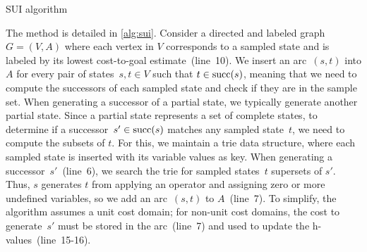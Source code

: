 \begin{algorithm}[tb]
    \caption{SUI algorithm}
    \label{alg:sui}

    \SetAlgoLined


\end{algorithm}

The method is detailed in \cref{alg:sui}. Consider a directed and labeled graph~$G=(V,A)$ where each vertex in $V$ corresponds to a sampled state and is labeled by its lowest cost-to-goal estimate~(line~10). We insert an arc~$(s,t)$ into $A$ for every pair of states~$s,t \in V$ such that $t \in \operatorname{succ}(s)$, meaning that we need to compute the successors of each sampled state and check if they are in the sample set. When generating a successor of a partial state, we typically generate another partial state. Since a partial state represents a set of complete states, to determine if a successor~$s' \in \operatorname{succ}(s)$ matches any sampled state~$t$, we need to compute the subsets of $t$. For this, we maintain a trie data structure, where each sampled state is inserted with its variable values as key. When generating a successor~$s'$~(line~6), we search the trie for sampled states~$t$ supersets of $s'$. Thus, $s$ generates $t$ from applying an operator and assigning zero or more undefined variables, so we add an arc~$(s,t)$ to $A$~(line~7). To simplify, the algorithm assumes a unit cost domain; for non-unit cost domains, the cost to generate~$s'$ must be stored in the arc~(line~7) and used to update the h-values~(line~15-16).

